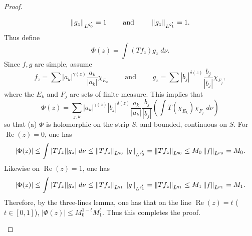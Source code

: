 \documentclass{article}
\begin{document}
\begin{proof}
\begin{enumerate}[itemsep =-2pt,label= (\arabic{*})]
\begin{equation*}
			\left\Vert g_{z} \right\Vert_{L^{q'_{0}}} = 1 \qquad \text{ and } \qquad \left\Vert g_{z} \right\Vert_{L^{q'_{1}}} = 1. 
		\end{equation*} 
		Thus define 
		\begin{equation*}
			\Phi(z) = \int (Tf_{z})g_{z}\;d\nu. 
		\end{equation*} 
		Since $f, g$ are simple, assume 
		\begin{equation*}
			f_{z} = \sum |a_{k}|^{\gamma(z)}\frac{a_{k}}{|a_{k}|}\chi_{E_{k}} \qquad \text{ and }\qquad g_{z} = \sum |b_{j}|^{\delta(z)}\frac{b_{j}}{|b_{j}|}\chi_{F_{j}}, 
		\end{equation*} 
		where the $E_{k}$ and $F_{j}$ are sets of finite measure. This implies that 
		\begin{equation*}
			\Phi(z) = \sum_{j,k} |a_{k}|^{\gamma(z)}|b_{j}|^{\delta(z)}\frac{a_{k}}{|a_{k}|}\frac{b_{j}}{|b_{j}|}\left(\int T(\chi_{E_{k}})\chi_{F_{j}}\;d\nu\right) 
		\end{equation*} 
		so that (a) $\Phi$ is holomorphic on the strip $S$, and bounded, continuous on $\bar{S}$. For $\operatorname{Re}(z) = 0$, one has 
		\begin{equation*}
			|\Phi(z)| \leq \int|Tf_{z}||g_{z}|\;d\nu \leq \left\Vert Tf_{z} \right\Vert_{L^{q_{0}}}\left\Vert g \right\Vert_{L^{q_{0}'}} = \left\Vert Tf_{z} \right\Vert_{L^{q_{0}}} \leq M_{0}\left\Vert f \right\Vert_{L^{p_{0}}} = M_{0}. 
		\end{equation*}
		Likewise on $\operatorname{Re}(z) = 1$, one has 
		\begin{equation*}
			|\Phi(z)| \leq \int |Tf_{z}||g_{z}|\;d\nu \leq \left\Vert Tf_{z} \right\Vert_{L^{q_{1}}}\left\Vert g \right\Vert_{L^{q_{1}'}} = \left\Vert Tf_{z} \right\Vert_{L^{q_{1}}} \leq M_{1}\left\Vert f \right\Vert_{L^{p_{1}}}= M_{1}. 
		\end{equation*}  
		Therefore, by the three-lines lemma, one has that on the line $\operatorname{Re}(z) = t$ ($t \in [0,1]$), $|\Phi(z)| \leq M_{0}^{1 - t}M_{1}^{t}$. Thus this completes the proof. 
		

\end{enumerate}
\end{proof}
\end{document}
